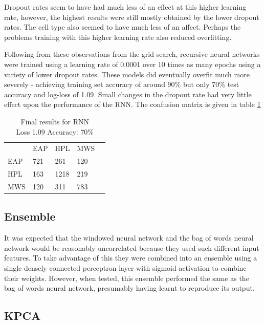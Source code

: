     Dropout rates seem to have had much less of an effect at this higher
    learning rate, however, the highest results were still mostly obtained by
    the lower dropout rates. The cell type also seemed to have much less of an
    affect. Perhaps the problems training with this higher learning rate also
    reduced overfitting.

    Following from these observations from the grid search, recursive neural
    networks were trained using a learning rate of 0.0001 over 10 times as many
    epochs using a variety of lower dropout rates. These models did eventually
    overfit much more severely - achieving training set accuracy of around 90\%
    but only 70\% test accuracy and log-loss of 1.09. Small changes in the
    dropout rate had very little effect upon the performance of the RNN. The
    confusion matrix is given in table \ref{tab:rnn_res}

\begin{table}[h]
\centering
\begin{tabular}{m{1cm}|m{1cm}|m{1cm}|m{1cm}|m{0cm}}
\multicolumn{1}{m{1cm}}{} & \multicolumn{1}{m{1cm}}{EAP} & \multicolumn{1}{m{1cm}}{HPL} & \multicolumn{1}{m{1cm}}{MWS} &\\[5pt]
\cline{2-4}
EAP & 721 & 261 & 120 & \\[5pt]
\cline{2-4}
HPL & 163 & 1218 & 219 & \\[5pt]
\cline{2-4}
MWS & 120 & 311 & 783 & \\[5pt]
\cline{2-4}
\end{tabular}
\caption{Final results for RNN\\Loss 1.09 Accuracy: 70\% }
\label{tab:rnn_res}
\end{table}


    \subsection{Ensemble}
    \label{sec:ensemble}

    It was expected that the windowed neural network and the bag of words neural
    network would be reasonably uncorrelated because they used such different
    input features. To take advantage of this they were combined into an
    ensemble using a single densely connected perceptron layer with sigmoid
    activation to combine their weights. However, when tested, this ensemble
    performed the same as the bag of words neural network, presumably having
    learnt to reproduce its output.

\subsection{KPCA}
\label{sec:kpca}
  
